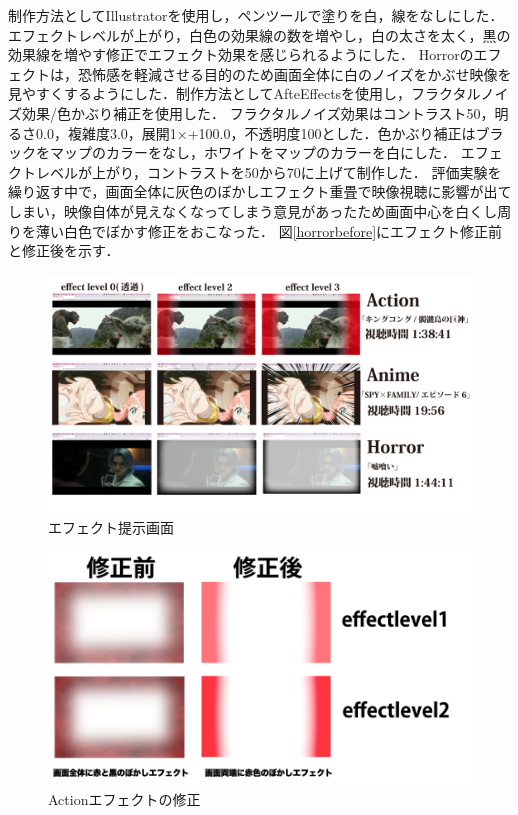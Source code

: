 制作方法としてIllustratorを使用し，ペンツールで塗りを白，線をなしにした．エフェクトレベルが上がり，白色の効果線の数を増やし，白の太さを太く，黒の効果線を増やす修正でエフェクト効果を感じられるようにした．
Horrorのエフェクトは，恐怖感を軽減させる目的のため画面全体に白のノイズをかぶせ映像を見やすくするようにした．制作方法としてAfteEffectsを使用し，フラクタルノイズ効果/色かぶり補正を使用した．
フラクタルノイズ効果はコントラスト50，明るさ0.0，複雑度3.0，展開1×+100.0，不透明度100とした．色かぶり補正はブラックをマップのカラーをなし，ホワイトをマップのカラーを白にした．
エフェクトレベルが上がり，コントラストを50から70に上げて制作した．
評価実験を繰り返す中で，画面全体に灰色のぼかしエフェクト重畳で映像視聴に影響が出てしまい，映像自体が見えなくなってしまう意見があったため画面中心を白くし周りを薄い白色でぼかす修正をおこなった．
図\ref{horrorbefore}にエフェクト修正前と修正後を示す．
 
\begin{figure}[H]
   \centering
   \includegraphics[width=16cm]{images/chapter3/efects.jpg}
   \caption{エフェクト提示画面}
   \label{efectteiji}
\end{figure}
 
\begin{figure}[H]
   \centering
   \includegraphics[width=16cm]{images/chapter3/actionberore.jpg}
   \caption{Actionエフェクトの修正}
   \label{actionbefore}
\end{figure}
 
